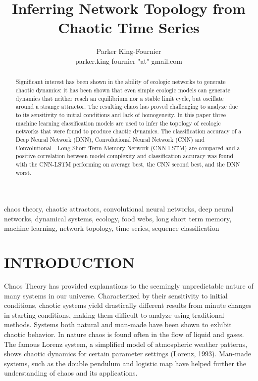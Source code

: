 \documentclass[letterpaper, 10 pt, conference]{ieeeconf}  %
\title{\LARGE \bf
Inferring Network Topology from Chaotic Time Series
}
\author{Parker King-Fournier \\
		parker.king-fournier "at" gmail.com}
\begin{document}
\maketitle
\thispagestyle{empty}
\pagestyle{empty}

\begin{abstract}
Significant interest has been shown in the ability of ecologic networks to generate chaotic dynamics: it has been shown that even simple ecologic models can generate  dynamics that neither reach an equilibrium nor a stable limit cycle, but oscillate around a strange attractor. The resulting chaos has proved challenging to analyze due to its sensitivity to initial conditions and lack of homogeneity. In this paper three machine learning classification models are used to infer the topology of ecologic networks that were found to produce chaotic dynamics. The classification accuracy of a Deep Neural Network (DNN), Convolutional Neural Network (CNN) and Convolutional - Long Short Term Memory Network (CNN-LSTM) are compared and a positive correlation between model complexity and classification accuracy was found with the  CNN-LSTM performing on average best, the CNN second best, and the DNN worst. 
\end{abstract}
\begin{keywords}
chaos theory, chaotic attractors, convolutional neural networks, deep neural networks, dynamical systems, ecology, food webs, long short term memory, machine learning, network topology, time series, sequence classification 
\end{keywords}


\section{INTRODUCTION}
	Chaos Theory has provided explanations to the seemingly unpredictable nature of many systems in our universe. Characterized by their sensitivity to initial conditions, chaotic systems yield drastically different results from minute changes in starting conditions, making them difficult to analyze using traditional methods. Systems both natural and man-made have been shown to exhibit chaotic behavior. In nature chaos is found often in the flow of liquid and gases. The famous Lorenz system, a simplified model of atmospheric weather patterns, shows chaotic dynamics for certain parameter settings (Lorenz, 1993). Man-made systems, such as the double pendulum and logistic map have helped further the understanding of chaos and its applications.
\end{document}

